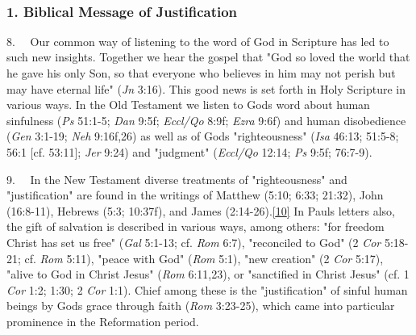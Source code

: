~

\subsubsection{1. Biblical Message of
Justification}\label{biblical-message-of-justification}

8.~ ~Our common way of listening to the word of God in Scripture has led
to such new insights. Together we hear the gospel that "God so loved the
world that he gave his only Son, so that everyone who believes in him
may not perish but may have eternal life" (\emph{Jn} 3:16). This good
news is set forth in Holy Scripture in various ways. In the Old
Testament we listen to God\textquotesingle s word about human sinfulness
(\emph{Ps} 51:1-5; \emph{Dan} 9:5f; \emph{Eccl/Qo} 8:9f; \emph{Ezra}
9:6f) and human disobedience (\emph{Gen} 3:1-19; \emph{Neh} 9:16f,26) as
well as of God\textquotesingle s "righteousness" (\emph{Isa} 46:13;
51:5-8; 56:1 {[}cf. 53:11{]}; \emph{Jer} 9:24) and "judgment"
(\emph{Eccl/Qo} 12:14; \emph{Ps} 9:5f; 76:7-9).

9.~ ~In the New Testament diverse treatments of "righteousness" and
"justification" are found in the writings of Matthew (5:10; 6:33;
21:32), John (16:8-11), Hebrews (5:3; 10:37f), and James
(2:14-26).\label{r10}{}\hyperref[10]{{[}10{]}} In
Paul\textquotesingle s letters also, the gift of salvation is described
in various ways, among others: "for freedom Christ has set us free"
(\emph{Gal} 5:1-13; cf. \emph{Rom} 6:7), "reconciled to God" (2
\emph{Cor} 5:18-21; cf. \emph{Rom} 5:11), "peace with God" (\emph{Rom}
5:1), "new creation" (2 \emph{Cor} 5:17), "alive to God in Christ Jesus"
(\emph{Rom} 6:11,23), or "sanctified in Christ Jesus" (cf. 1 \emph{Cor}
1:2; 1:30; 2 \emph{Cor} 1:1). Chief among these is the "justification"
of sinful human beings by God\textquotesingle s grace through faith
(\emph{Rom} 3:23-25), which came into particular prominence in the
Reformation period.

